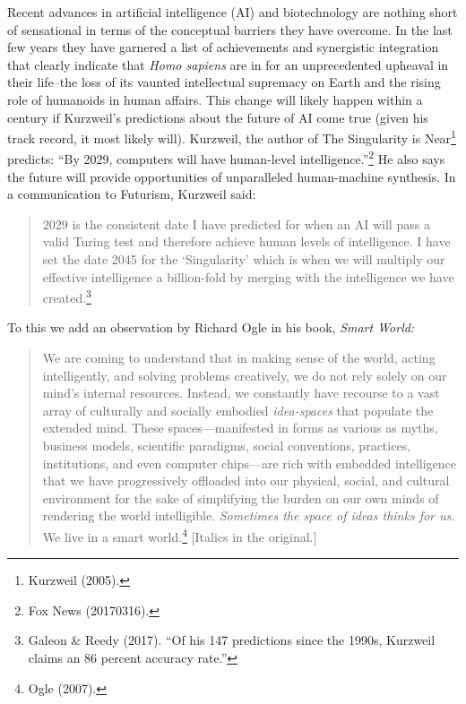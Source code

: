 \begin{multicols}{2}
Recent advances in artificial intelligence (AI) and biotechnology are nothing short of sensational in terms of the conceptual barriers they have overcome. In the last few years they have garnered a list of achievements and synergistic integration that clearly indicate that \textit{Homo sapiens} are in for an unprecedented upheaval in their life--the loss of its vaunted intellectual supremacy on Earth and the rising role of humanoids in human affairs. This change will likely happen within a century if Kurzweil's predictions about the future of AI come true (given his track record, it most likely will). Kurzweil, the author of The Singularity is Near\footnote{Kurzweil (2005).} predicts: “By 2029, computers will have human-level intelligence.”\footnote{Fox News (20170316).} He also says the future will provide opportunities of unparalleled human-machine synthesis. In a communication to Futurism, Kurzweil said:
\begin{quote}
2029 is the consistent date I have predicted for when an AI will pass a valid Turing test and therefore achieve human levels of intelligence. I have set the date 2045 for the `Singularity' which is when we will multiply our effective intelligence a billion-fold by merging with the intelligence we have created.\footnote{Galeon \& Reedy (2017). “Of his 147 predictions since the 1990s, Kurzweil claims an 86 percent accuracy rate.”}
\end{quote}

To this we add an observation by Richard Ogle in his book, \textit{Smart World:}
\begin{quote}
We are coming to understand that in making sense of the world, acting intelligently, and solving problems creatively, we do not rely solely on our mind's internal resources. Instead, we constantly have recourse to a vast array of culturally and socially embodied \textit{idea-spaces} that populate the extended mind. These spaces---manifested in forms as various as myths, business models, scientific paradigms, social conventions, practices, institutions, and even computer chips---are rich with embedded intelligence that we have progressively offloaded into our physical, social, and cultural environment for the sake of simplifying the burden on our own minds of rendering the world intelligible. \textit{Sometimes the space of ideas thinks for us.} We live in a smart world.\footnote{Ogle (2007).} [Italics in the original.] 
\end{quote}


\end{multicols}
